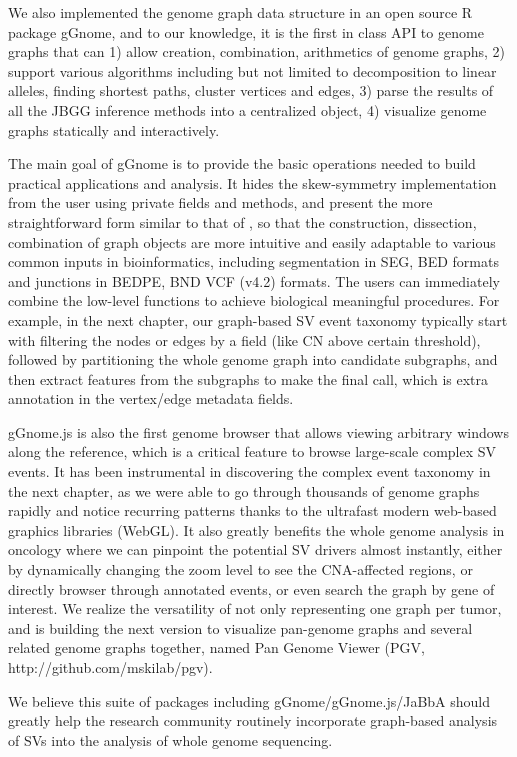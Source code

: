 \documentclass[phd,tocprelim]{cornell}
\begin{document}
We also implemented the genome graph data structure in an open source R package gGnome, and to our knowledge, it is the first in class API to genome graphs that can 1) allow creation, combination, arithmetics of genome graphs, 2) support various algorithms including but not limited to decomposition to linear alleles, finding shortest paths, cluster vertices and edges, 3) parse the results of all the JBGG inference methods into a centralized object, 4) visualize genome graphs statically and interactively.

The main goal of gGnome is to provide the basic operations needed to build practical applications and analysis. It hides the skew-symmetry implementation from the user using private fields and methods, and present the more straightforward form similar to that of \cite{Greenman:2012eg}, so that the construction, dissection, combination of graph objects are more intuitive and easily adaptable to various common inputs in bioinformatics, including segmentation in SEG, BED formats and junctions in BEDPE, BND VCF (v4.2) formats. The users can immediately combine the low-level functions to achieve biological meaningful procedures. For example, in the next chapter, our graph-based SV event taxonomy typically start with filtering the nodes or edges by a field (like CN above certain threshold), followed by partitioning the whole genome graph into candidate subgraphs, and then extract features from the subgraphs to make the final call, which is extra annotation in the vertex/edge metadata fields.

gGnome.js is also the first genome browser that allows viewing arbitrary windows along the reference, which is a critical feature to browse large-scale complex SV events. It has been instrumental in discovering the complex event taxonomy in the next chapter, as we were able to go through thousands of genome graphs rapidly and notice recurring patterns thanks to the ultrafast modern web-based graphics libraries (WebGL). It also greatly benefits the whole genome analysis in oncology where we can pinpoint the potential SV drivers almost instantly, either by dynamically changing the zoom level to see the CNA-affected regions, or directly browser through annotated events, or even search the graph by gene of interest. We realize the versatility of not only representing one graph per tumor, and is building the next version to visualize pan-genome graphs and several related genome graphs together, named Pan Genome Viewer (PGV, http://github.com/mskilab/pgv).

We believe this suite of packages including gGnome/gGnome.js/JaBbA should greatly help the research community routinely incorporate graph-based analysis of SVs into the analysis of whole genome sequencing.
\end{document}

